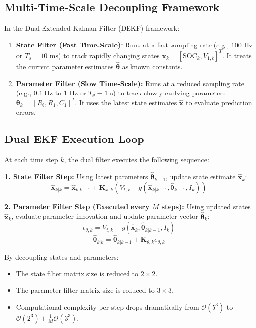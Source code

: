 \subsection{Multi-Time-Scale Decoupling Framework}
In the Dual Extended Kalman Filter (DEKF) framework:
\begin{enumerate}
    \item \textbf{State Filter (Fast Time-Scale):} Runs at a fast sampling rate (e.g., $100\text{ Hz}$ or $T_s = 10\text{ ms}$) to track rapidly changing states $\mathbf{x}_k = [\text{SOC}_k, V_{1,k}]^T$. It treats the current parameter estimates $\hat{\boldsymbol{\theta}}$ as known constants.
    \item \textbf{Parameter Filter (Slow Time-Scale):} Runs at a reduced sampling rate (e.g., $0.1\text{ Hz}$ to $1\text{ Hz}$ or $T_\theta = 1\text{ s}$) to track slowly evolving parameters $\boldsymbol{\theta}_k = [R_0, R_1, C_1]^T$. It uses the latest state estimates $\hat{\mathbf{x}}$ to evaluate prediction errors.
\end{enumerate}

\subsection{Dual EKF Execution Loop}
At each time step $k$, the dual filter executes the following sequence:

\textbf{1. State Filter Step:}
Using latest parameters $\hat{\boldsymbol{\theta}}_{k-1}$, update state estimate $\hat{\mathbf{x}}_k$:
\begin{equation}
\hat{\mathbf{x}}_{k|k} = \hat{\mathbf{x}}_{k|k-1} + \mathbf{K}_{x,k} \left( V_{t,k} - g(\hat{\mathbf{x}}_{k|k-1}, \hat{\boldsymbol{\theta}}_{k-1}, I_k) \right)
\end{equation}

\textbf{2. Parameter Filter Step (Executed every $M$ steps):}
Using updated states $\hat{\mathbf{x}}_k$, evaluate parameter innovation and update parameter vector $\hat{\boldsymbol{\theta}}_k$:
\begin{equation}
e_{\theta, k} = V_{t,k} - g(\hat{\mathbf{x}}_k, \hat{\boldsymbol{\theta}}_{k|k-1}, I_k)
\end{equation}
\begin{equation}
\hat{\boldsymbol{\theta}}_{k|k} = \hat{\boldsymbol{\theta}}_{k|k-1} + \mathbf{K}_{\theta, k} e_{\theta, k}
\end{equation}

By decoupling states and parameters:
\begin{itemize}
    \item The state filter matrix size is reduced to $2 \times 2$.
    \item The parameter filter matrix size is reduced to $3 \times 3$.
    \item Computational complexity per step drops dramatically from $\mathcal{O}(5^3)$ to $\mathcal{O}(2^3) + \frac{1}{M}\mathcal{O}(3^3)$.
\end{itemize}

